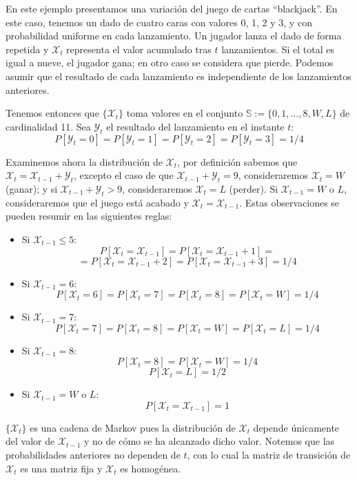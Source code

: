 \begin{exampleth}
En este ejemplo presentamos una variación del juego de cartas \enquote{blackjack}. En este caso, tenemos un dado de cuatro caras con valores 0, 1, 2 y 3, y con probabilidad uniforme en cada lanzamiento. Un jugador lanza el dado de forma repetida y $\mathcal{X}_t$ representa el valor acumulado tras $t$ lanzamientos. Si el total es igual a nueve, el jugador gana; en otro caso se considera que pierde. Podemos asumir que el resultado de cada lanzamiento es independiente de los lanzamientos anteriores.

Tenemos entonces que $\{\mathcal{X}_t\}$ toma valores en el conjunto $\mathbb{S}:=\{0,1,...,8,W,L\}$ de cardinalidad 11. Sea $\mathcal{Y}_t$ el resultado del lanzamiento en el instante $t$:
\[
P[\mathcal{Y}_t=0]=P[\mathcal{Y}_t=1]=P[\mathcal{Y}_t=2]=P[\mathcal{Y}_t=3]=1/4
\]

Examinemos ahora la distribución de $\mathcal{X}_t$, por definición sabemos que $\mathcal{X}_t=\mathcal{X}_{t-1}+\mathcal{Y}_t$, excepto el caso de que $\mathcal{X}_{t-1}+\mathcal{Y}_t=9$, consideraremos $\mathcal{X}_t=W$ (ganar); y si $\mathcal{X}_{t-1}+\mathcal{Y}_t>9$, consideraremos $\mathcal{X}_t=L$ (perder). Si $\mathcal{X}_{t-1}=W$ o $L$, consideraremos que el juego está acabado y $\mathcal{X}_t=\mathcal{X}_{t-1}$. Estas observaciones se pueden resumir en las siguientes reglas:

\begin{itemize}
    \item Si $\mathcal{X}_{t-1}\leq5$:
    \[
    P[\mathcal{X}_t=\mathcal{X}_{t-1}]=P[\mathcal{X}_t=\mathcal{X}_{t-1}+1]=\]\[=P[\mathcal{X}_t=\mathcal{X}_{t-1}+2]=P[\mathcal{X}_t=\mathcal{X}_{t-1}+3]=1/4
    \]
    \item Si $\mathcal{X}_{t-1}=6$:
    \[
    P[\mathcal{X}_t=6]=P[\mathcal{X}_t=7]=P[\mathcal{X}_t=8]=P[\mathcal{X}_t=W]=1/4
    \]
    \item Si $\mathcal{X}_{t-1}=7$:
    \[
    P[\mathcal{X}_t=7]=P[\mathcal{X}_t=8]=P[\mathcal{X}_t=W]=P[\mathcal{X}_t=L]=1/4
    \]
    \item Si $\mathcal{X}_{t-1}=8$:
    \[
        P[\mathcal{X}_t=8]=P[\mathcal{X}_t=W]=1/4
    \]\[
        P[\mathcal{X}_t=L]=1/2
    \]
    \item Si $\mathcal{X}_{t-1}=W$ o $L$:
    \[
        P[\mathcal{X}_t=\mathcal{X}_{t-1}]=1
    \]
\end{itemize}

$\{\mathcal{X}_t\}$ es una cadena de Markov pues la distribución de $\mathcal{X}_t$ depende únicamente del valor de $\mathcal{X}_{t-1}$ y no de cómo se ha alcanzado dicho valor. Notemos que las probabilidades anteriores no dependen de $t$, con lo cual la matriz de transición de $\mathcal{X}_t$ es una matriz fija y $\mathcal{X}_t$ es homogénea. 


\end{exampleth}
